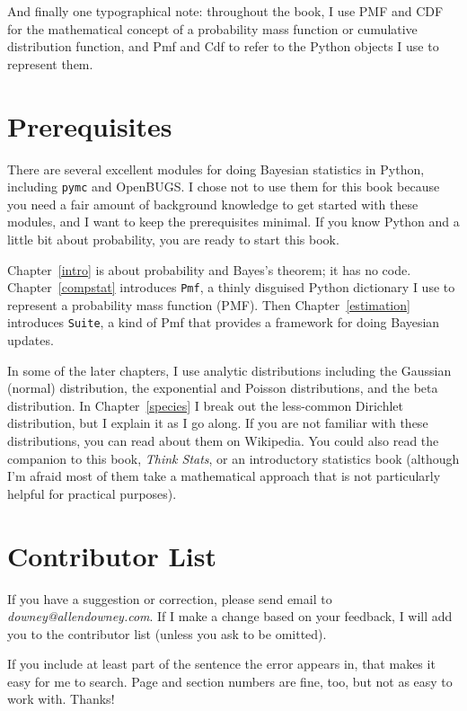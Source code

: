 \documentclass[12pt]{book}
\begin{document}
And finally one typographical note: throughout the book, I use
PMF and CDF for the mathematical concept of a probability
mass function or cumulative distribution function, and Pmf and Cdf
to refer to the Python objects I use to represent them.


\section{Prerequisites}

There are several excellent modules for doing Bayesian statistics in
Python, including {\tt pymc} and OpenBUGS.  I chose not to use them
for this book because you need a fair amount of background knowledge
to get started with these modules, and I want to keep the
prerequisites minimal.  If you know Python and a little bit about
probability, you are ready to start this book.

Chapter~\ref{intro} is about probability and Bayes's theorem; it has
no code.  Chapter~\ref{compstat} introduces {\tt Pmf}, a thinly disguised
Python dictionary I use to represent a probability mass function
(PMF).  Then Chapter~\ref{estimation} introduces {\tt Suite}, a kind
of Pmf that provides a framework for doing Bayesian updates.

In some of the later chapters, I use
analytic distributions including the Gaussian (normal) distribution,
the exponential and Poisson distributions, and the beta distribution.
In Chapter~\ref{species} I break out the less-common Dirichlet
distribution, but I explain it as I go along.  If you are not familiar
with these distributions, you can read about them on Wikipedia.  You
could also read the companion to this book, {\it Think Stats}, or an
introductory statistics book (although I'm afraid most of them take
a mathematical approach that is not particularly helpful for practical
purposes).



\section*{Contributor List}

If you have a suggestion or correction, please send email to 
{\it downey@allendowney.com}.  If I make a change based on your
feedback, I will add you to the contributor list
(unless you ask to be omitted).

If you include at least part of the sentence the
error appears in, that makes it easy for me to search.  Page and
section numbers are fine, too, but not as easy to work with.
Thanks!
\end{document}
